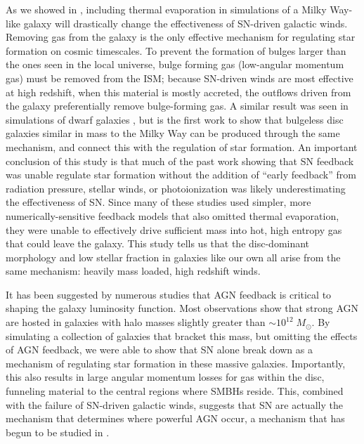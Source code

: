 As we showed in \citet{Keller2015}, including thermal evaporation in simulations
of a Milky Way-like galaxy will drastically change the effectiveness of
SN-driven galactic winds.  Removing gas from the galaxy is the only effective
mechanism for regulating star formation on cosmic timescales.  To prevent the
formation of bulges larger than the ones seen in the local universe, bulge
forming gas (low-angular momentum gas) must be removed from the ISM; because
SN-driven winds are most effective at high redshift, when this material is
mostly accreted, the outflows driven from the galaxy preferentially remove
bulge-forming gas.  A similar result was seen in simulations of dwarf galaxies
\citep{Governato2010, Brook2011}, but \citet{Keller2015} is the first work to
show that bulgeless disc galaxies similar in mass to the Milky Way can be
produced through the same mechanism, and connect this with the regulation of
star formation.  An important conclusion of this study is that much of the past
work \citep{Stinson2013,Agertz2013,Hopkins2014} showing that SN feedback was
unable regulate star formation without the addition of ``early feedback'' from
radiation pressure, stellar winds, or photoionization was likely underestimating
the effectiveness of SN.  Since many of these studies used simpler, more
numerically-sensitive feedback models that also omitted thermal evaporation,
they were unable to effectively drive sufficient mass into hot, high
entropy gas that could leave the galaxy.  This study tells us that the
disc-dominant morphology and low stellar fraction in galaxies like our own all
arise from the same mechanism:  heavily mass loaded, high redshift winds.

It has been suggested by numerous studies \citep{Benson2003,Bower2006} that AGN
feedback is critical to shaping the galaxy luminosity function.  Most
observations \citep{Kauffmann2003b} show that strong AGN are hosted in galaxies
with halo masses slightly greater than $\sim10^{12}\;M_\odot$.  By simulating a
collection of galaxies that bracket this mass, but omitting the effects of AGN
feedback, we were able to show that SN alone break down as a mechanism of
regulating star formation in these massive galaxies.  Importantly, this also
results in large angular momentum losses for gas within the disc, funneling
material to the central regions where SMBHs reside.  This, combined with the
failure of SN-driven galactic winds, suggests that SN are actually the mechanism
that determines where powerful AGN occur, a mechanism that has begun to be studied in
\citet{Bower2016}.

